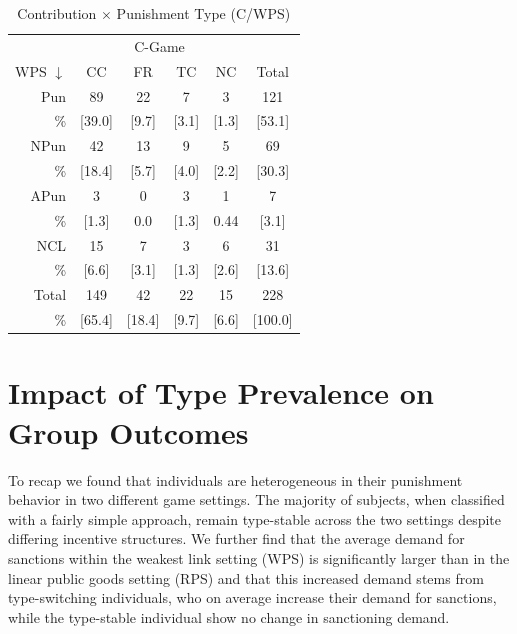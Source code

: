 \documentclass[11pt,a4paper]{article}
\newcommand{\mco}[2]{\multicolumn{#1}{c}{#2}}
\newcommand{\fns}{\footnotesize}
\begin{document}
\begin{refsection}
\begin{table}[htbp]
  \caption{Contribution $\times$ Punishment Type (C/WPS)}
  \centering
  \begin{tabular}{r|cccc|c}
  \mco{1}{}       & \mco{4}{C-Game} &                                                  \\ 
WPS  $\downarrow$ & CC              & FR         & TC        & NC        & Total       \\
\midrule
Pun               & 89              & 22         & 7         & 3         & 121         \\
\fns \%           & \fns[39.0]      & \fns[9.7]  & \fns[3.1] & \fns[1.3] & \fns[53.1]  \\
[.3em]          
  NPun            & 42              & 13         & 9         & 5         & 69          \\
\fns \%           & \fns[18.4]      & \fns[5.7]  & \fns[4.0] & \fns[2.2] & \fns[30.3]  \\
[.3em]         
  APun            & 3               & 0          & 3         & 1         & 7           \\
\fns \%           & \fns[1.3]       & 0.0        & \fns[1.3] & 0.44      & \fns[3.1]   \\
[.3em]        
NCL               & 15              & 7          & 3         & 6         & 31          \\
\fns \%           & \fns[6.6]       & \fns[3.1]  & \fns[1.3] & \fns[2.6] & \fns[13.6]  \\
\midrule         
Total             & 149             & 42         & 22        & 15        & 228         \\
\fns \%           & \fns[65.4]      & \fns[18.4] & \fns[9.7] & \fns[6.6] & \fns[100.0] \\
\bottomrule
  \end{tabular}
  \label{tab:ccpunWPS}
\end{table}

\clearpage

\section{Impact of Type Prevalence on Group Outcomes}

To recap we found that individuals are heterogeneous in their punishment
behavior in two different game settings. The majority of subjects, when classified with a fairly simple approach,
remain type-stable across the two settings despite differing incentive
structures. We further find that the average demand for sanctions within the
weakest link setting (WPS) is significantly larger than in the linear public goods
setting (RPS) and that this increased demand stems from type-switching
individuals, who on average increase their demand for sanctions, while the
type-stable individual show no change in sanctioning demand.


\end{refsection}
\end{document}

